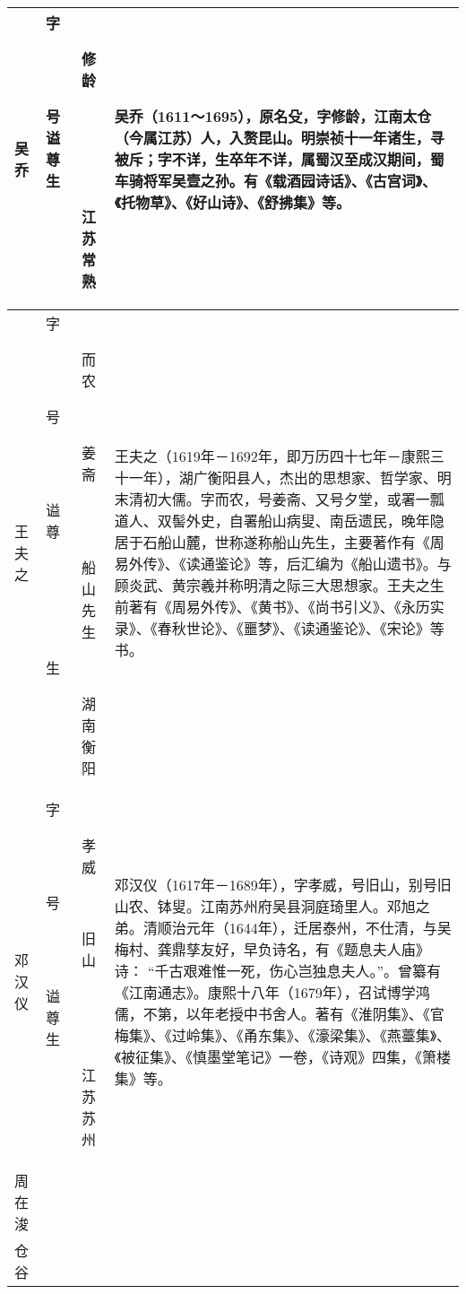 \begin{longtable}{|>{\centering\namefont\heiti}m{2em}|>{\centering\tiny}m{3.0em}|>{\xzfont\kaiti}m{7em}|}
  吴乔 & \begin{description}
  \item[字] 修龄
  \item[号] 
  \item[谥] 
  \item[尊] 
  \item[生] 江苏常熟
  \end{description} & 吴乔（1611～1695），原名殳，字修龄，江南太仓（今属江苏）人，入赘昆山。明崇祯十一年诸生，寻被斥；字不详，生卒年不详，属蜀汉至成汉期间，蜀车骑将军吴壹之孙。有《载酒园诗话》、《古宫词》、《托物草》、《好山诗》、《舒拂集》等。 \tabularnewline\hline
  王夫之 & \begin{description}
  \item[字] 而农
  \item[号] 姜斋
  \item[谥] 
  \item[尊] 船山先生
  \item[生] 湖南衡阳
  \end{description} & 王夫之（1619年－1692年，即万历四十七年－康熙三十一年），湖广衡阳县人，杰出的思想家、哲学家、明末清初大儒。字而农，号姜斋、又号夕堂，或署一瓢道人、双髻外史，自署船山病叟、南岳遗民，晚年隐居于石船山麓，世称遂称船山先生，主要著作有《周易外传》、《读通鉴论》等，后汇编为《船山遗书》。与顾炎武、黄宗羲并称明清之际三大思想家。王夫之生前著有《周易外传》、《黄书》、《尚书引义》、《永历实录》、《春秋世论》、《噩梦》、《读通鉴论》、《宋论》等书。 \tabularnewline\hline
  邓汉仪 & \begin{description}
  \item[字] 孝威
  \item[号] 旧山
  \item[谥] 
  \item[尊] 
  \item[生] 江苏苏州
  \end{description} & 邓汉仪（1617年－1689年），字孝威，号旧山，别号旧山农、钵叟。江南苏州府吴县洞庭琦里人。邓旭之弟。清顺治元年（1644年），迁居泰州，不仕清，与吴梅村、龚鼎孳友好，早负诗名，有《题息夫人庙》诗： “千古艰难惟一死，伤心岂独息夫人。”。曾纂有《江南通志》。康熙十八年（1679年），召试博学鸿儒，不第，以年老授中书舍人。著有《淮阴集》、《官梅集》、《过岭集》、《甬东集》、《濠梁集》、《燕薹集》、《被征集》、《慎墨堂笔记》一卷，《诗观》四集，《箫楼集》等。 \tabularnewline\hline
  周在浚 & \begin{description}
  \item[字] 雪客
  \item[号] 犁庄\\仓谷

\end{description}
\end{longtable}
